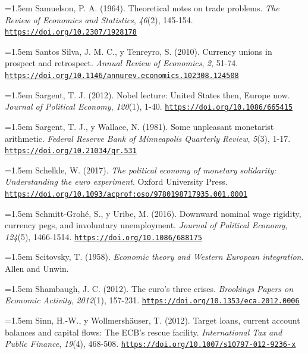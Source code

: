 \documentclass[10pt,a4paper]{article}
\begin{document}
\noindent\hangindent=1.5em Samuelson, P. A. (1964). Theoretical notes on trade problems. \textit{The Review of Economics and Statistics}, \textit{46}(2), 145-154. \href{https://doi.org/10.2307/1928178}{\nolinkurl{https://doi.org/10.2307/1928178}}

\noindent\hangindent=1.5em Santos Silva, J. M. C., y Tenreyro, S. (2010). Currency unions in prospect and retrospect. \textit{Annual Review of Economics}, \textit{2}, 51-74. \href{https://doi.org/10.1146/annurev.economics.102308.124508}{\nolinkurl{https://doi.org/10.1146/annurev.economics.102308.124508}}

\noindent\hangindent=1.5em Sargent, T. J. (2012). Nobel lecture: United States then, Europe now. \textit{Journal of Political Economy}, \textit{120}(1), 1-40. \href{https://doi.org/10.1086/665415}{\nolinkurl{https://doi.org/10.1086/665415}}

\noindent\hangindent=1.5em Sargent, T. J., y Wallace, N. (1981). Some unpleasant monetarist arithmetic. \textit{Federal Reserve Bank of Minneapolis Quarterly Review}, \textit{5}(3), 1-17. \href{https://doi.org/10.21034/qr.531}{\nolinkurl{https://doi.org/10.21034/qr.531}}

\noindent\hangindent=1.5em Schelkle, W. (2017). \textit{The political economy of monetary solidarity: Understanding the euro experiment}. Oxford University Press. \href{https://doi.org/10.1093/acprof:oso/9780198717935.001.0001}{\nolinkurl{https://doi.org/10.1093/acprof:oso/9780198717935.001.0001}}

\noindent\hangindent=1.5em Schmitt-Grohé, S., y Uribe, M. (2016). Downward nominal wage rigidity, currency pegs, and involuntary unemployment. \textit{Journal of Political Economy}, \textit{124}(5), 1466-1514. \href{https://doi.org/10.1086/688175}{\nolinkurl{https://doi.org/10.1086/688175}}

\noindent\hangindent=1.5em Scitovsky, T. (1958). \textit{Economic theory and Western European integration}. Allen and Unwin.

\noindent\hangindent=1.5em Shambaugh, J. C. (2012). The euro's three crises. \textit{Brookings Papers on Economic Activity}, \textit{2012}(1), 157-231. \href{https://doi.org/10.1353/eca.2012.0006}{\nolinkurl{https://doi.org/10.1353/eca.2012.0006}}

\noindent\hangindent=1.5em Sinn, H.-W., y Wollmershäuser, T. (2012). Target loans, current account balances and capital flows: The ECB's rescue facility. \textit{International Tax and Public Finance}, \textit{19}(4), 468-508. \href{https://doi.org/10.1007/s10797-012-9236-x}{\nolinkurl{https://doi.org/10.1007/s10797-012-9236-x}}
\end{document}
